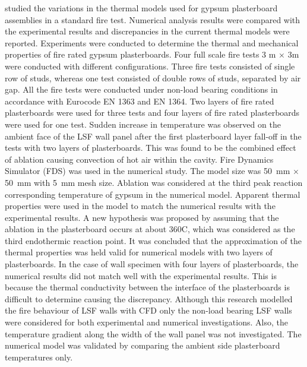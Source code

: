 \citet{Lazaro2016} studied the variations in the thermal models used for gypsum plasterboard assemblies in a standard fire test. Numerical analysis results were compared with the experimental results and discrepancies in the current thermal models were reported. Experiments were conducted to determine the thermal and mechanical properties of fire rated gypsum plasterboards. Four full scale fire tests 3 m \(\times\) 3m were conducted with different configurations. Three fire tests consisted of single row of studs, whereas one test consisted of double rows of studs, separated by air gap. All the fire tests were conducted under non-load bearing conditions in accordance with Eurocode EN 1363 and EN 1364. Two layers of fire rated plasterboards were used for three tests and four layers of fire rated plasterboards were used for one test. Sudden increase in temperature was observed on the ambient face of the LSF wall panel after the first plasterboard layer fall-off in the tests with two layers of plasterboards. This was found to be the combined effect of ablation causing convection of hot air within the cavity. Fire Dynamics Simulator (FDS) was used in the numerical study. The model size was 50~mm \(\times\) 50~mm with 5~mm mesh size. Ablation was considered at the third peak reaction corresponding temperature of gypsum in the numerical model. Apparent thermal properties were used in the model to match the numerical results with the experimental results. A new hypothesis was proposed by assuming that the ablation in the plasterboard occurs at about 360\degree C, which was considered as the third endothermic reaction point. It was concluded that the approximation of the thermal properties was held valid for numerical models with two layers of plasterboards. In the case of wall specimen with four layers of plasterboards, the numerical results did not match well with the experimental results. This is because the thermal conductivity between the interface of the plasterboards is difficult to determine causing the discrepancy. Although this research modelled the fire behaviour of LSF walls with CFD only the non-load bearing LSF walls were considered for both experimental and numerical investigations. Also, the temperature gradient along the width of the wall panel was not investigated. The numerical model was validated by comparing the ambient side plasterboard temperatures only.

